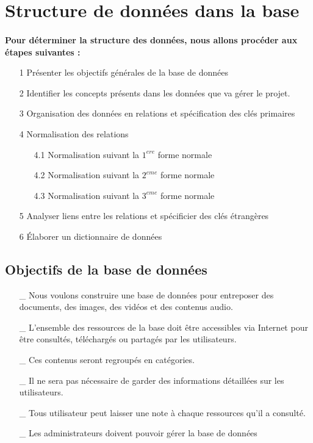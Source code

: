 	\section{Structure de donn\'ees dans la base}
		\paragraph{} \textbf{Pour d\'eterminer la structure des donn\'ees, nous allons proc\'eder aux \'etapes suivantes :}

		\begin{enumerate}
			\item[1] Pr\'esenter les objectifs g\'en\'erales de la base de donn\'ees
			\item[2] Identifier les concepts pr\'esents dans les donn\'ees que va g\'erer le projet.
			\item[3] Organisation des donn\'ees en relations et sp\'ecification des cl\'es primaires
			\item[4] Normalisation des relations
			\begin{itemize}
				\item[4.1] Normalisation suivant la $1^{ere}$ forme normale
				\item[4.2] Normalisation suivant la $2^{eme}$ forme normale
				\item[4.3] Normalisation suivant la $3^{eme}$ forme normale
			\end{itemize}
			\item[5] Analyser liens entre les relations et sp\'ecificier des cl\'es \'etrang\`eres
			\item[6] \'Elaborer un dictionnaire de donn\'ees
		\end{enumerate}
		\vspace{1cm}



		\subsection{Objectifs de la base de donn\'ees}
			\begin{itemize}
				\item[\_] Nous voulons construire une base de donn\'ees pour entreposer des documents, des images, des vid\'eos et des contenus audio.
				\item[\_] L'ensemble des ressources de la base doit \^etre accessibles via Internet pour \^etre consult\'es, t\'el\'echarg\'es ou partag\'es par les utilisateurs.
				\item[\_] Ces contenus seront regroup\'es en cat\'egories.
				\item[\_] Il ne sera pas n\'ecessaire de garder des informations d\'etaill\'ees sur les utilisateurs.
				\item[\_] Tous utilisateur peut laisser une note \`a chaque ressources qu'il a consult\'e.
				\item[\_] Les administrateurs doivent pouvoir g\'erer la base de donn\'ees
			\end{itemize}



